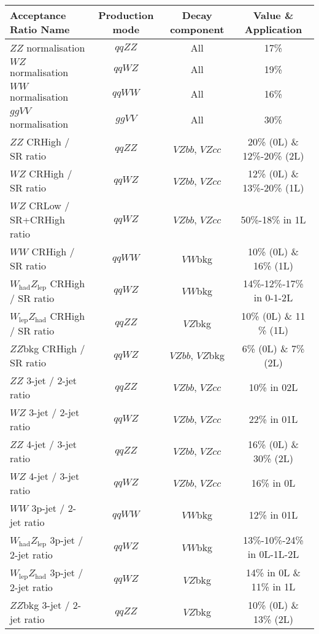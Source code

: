 \begin{table}[h!]
    \resizebox{1\textwidth}{!}
    {
     \begin{tabular}{ l | c c | c } 
     \hline \hline
     \textbf{Acceptance Ratio Name} & \textbf{Production mode} &  \textbf{Decay component} & \textbf{Value \& Application} \\
     \hline 
     $ZZ$ normalisation & $qqZZ$ & All & 17\%   \\ 
     $WZ$ normalisation & $qqWZ$ & All & 19\%   \\ 
     $WW$ normalisation & $qqWW$ & All & 16\%   \\ 
     $ggVV$ normalisation & $ggVV$ & All & 30\% \\ 
     \hline
     $ZZ$ CRHigh / SR ratio & $qqZZ$ & $VZbb$, $VZcc$ & 20\% (0L) \& 12\%-20\% (2L)     \\ 
     $WZ$ CRHigh / SR ratio & $qqWZ$ & $VZbb$, $VZcc$ & 12\% (0L) \& 13\%-20\% (1L)     \\ 
     $WZ$ CRLow / SR+CRHigh ratio & $qqWZ$ & $VZbb$, $VZcc$ & 50\%-18\% in 1L  \\ 
     $WW$ CRHigh / SR ratio & $qqWW$ & $VW$bkg & 10\% (0L) \& 16\% (1L)        \\ 
     $W_{\text{had}}Z_{\text{lep}}$ CRHigh / SR ratio & $qqWZ$ & $VW$bkg & 14\%-12\%-17\% in 0-1-2L   \\ 
     $W_{\text{lep}}Z_{\text{had}}$ CRHigh / SR ratio & $qqZZ$ & $VZ$bkg & 10\% (0L) \& 11 \% (1L) \\ 
     $ZZ$bkg CRHigh / SR ratio & $qqWZ$ & $VZbb$, $VZ$bkg & 6\% (0L) \& 7\% (2L) \\ 
     \hline
     $ZZ$ 3-jet / 2-jet ratio & $qqZZ$ & $VZbb$, $VZcc$ & 10\% in 02L \\ 
     $WZ$ 3-jet / 2-jet ratio & $qqWZ$ & $VZbb$, $VZcc$ & 22\% in 01L \\ 
     $ZZ$ 4-jet / 3-jet ratio & $qqZZ$ & $VZbb$, $VZcc$ & 16\% (0L) \& 30\% (2L) \\ 
     $WZ$ 4-jet / 3-jet ratio & $qqWZ$ & $VZbb$, $VZcc$ & 16\% in 0L \\ 
     $WW$ 3p-jet / 2-jet ratio & $qqWW$ & $VW$bkg & 12\% in 01L \\ 
     $W_{\text{had}}Z_{\text{lep}}$ 3p-jet / 2-jet ratio & $qqWZ$ & $VW$bkg & 13\%-10\%-24\% in 0L-1L-2L  \\  
     $W_{\text{lep}}Z_{\text{had}}$ 3p-jet / 2-jet ratio & $qqWZ$ & $VZ$bkg & 14\% in 0L \& 11\% in 1L \\ 
     $ZZ$bkg 3-jet / 2-jet ratio & $qqZZ$ & $VZ$bkg & 10\% (0L) \& 13\% (2L)\\  

\end{tabular}}
\end{table}

